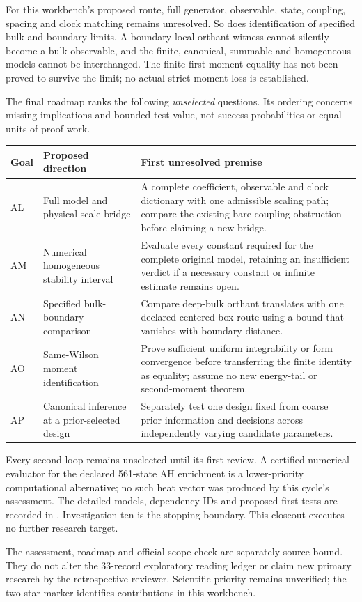 For this workbench's proposed route, full generator, observable, state, coupling, spacing and clock matching remains unresolved. So does identification of specified bulk and boundary limits. A boundary-local orthant witness cannot silently become a bulk observable, and the finite, canonical, summable and homogeneous models cannot be interchanged. The finite first-moment equality has not been proved to survive the limit; no actual strict moment loss is established.

The final roadmap ranks the following \emph{unselected} questions. Its ordering concerns missing implications and bounded test value, not success probabilities or equal units of proof work.
\begin{center}\small
\begin{tabularx}{\textwidth}{@{}p{10mm}p{43mm}X@{}}
\toprule Goal & Proposed direction & First unresolved premise \\
\midrule
AL & Full model and physical-scale bridge & A complete coefficient, observable and clock dictionary with one admissible scaling path; compare the existing bare-coupling obstruction before claiming a new bridge.\\[4pt]
AM & Numerical homogeneous stability interval & Evaluate every constant required for the complete original model, retaining an insufficient verdict if a necessary constant or infinite estimate remains open.\\[4pt]
AN & Specified bulk-boundary comparison & Compare deep-bulk orthant translates with one declared centered-box route using a bound that vanishes with boundary distance.\\[4pt]
AO & Same-Wilson moment identification & Prove sufficient uniform integrability or form convergence before transferring the finite identity as equality; assume no new energy-tail or second-moment theorem.\\[4pt]
AP & Canonical inference at a prior-selected design & Separately test one design fixed from coarse prior information and decisions across independently varying candidate parameters.\\
\bottomrule
\end{tabularx}
\end{center}
Every second loop remains unselected until its first review. A certified numerical evaluator for the declared 561-state AH enrichment is a lower-priority computational alternative; no such heat vector was produced by this cycle's assessment. The detailed models, dependency IDs and proposed first tests are recorded in . Investigation ten is the stopping boundary. This closeout executes no further research target.

The assessment, roadmap and official scope check are separately source-bound. They do not alter the 33-record exploratory reading ledger or claim new primary research by the retrospective reviewer. Scientific priority remains unverified; the two-star marker identifies contributions in this workbench.
